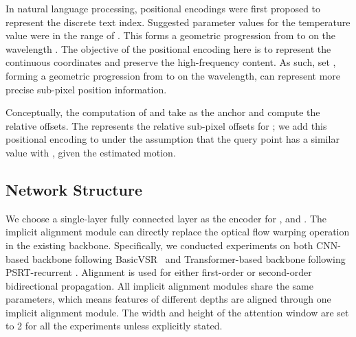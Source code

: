 \documentclass[10pt,twocolumn,letterpaper]{article}
\begin{document}
In natural language processing, positional encodings were first proposed to represent the discrete text index.  Suggested parameter values for the temperature value were in the range of .  This forms a geometric progression from  to  on the wavelength \cite{vaswani2017attention}. The objective of the positional encoding here is to represent the continuous coordinates and preserve the high-frequency content.  As such, set , forming a geometric progression from  to  on the wavelength, can represent more precise sub-pixel position information. 


Conceptually, the computation of  and  take  as the anchor and compute the relative offsets. The  represents the relative sub-pixel offsets for ; we add this positional encoding to  under the assumption that the query point  has a similar value with , given the estimated motion.




\subsection{Network Structure}
We choose a single-layer fully connected layer as the encoder for ,  and . The implicit alignment module can directly replace the optical flow warping operation in the existing backbone. Specifically, we conducted experiments on both CNN-based backbone following BasicVSR~\cite{chan2021basicvsr} and Transformer-based backbone following PSRT-recurrent \cite{shi2022rethinking}. Alignment is used for either first-order or second-order bidirectional propagation. All implicit alignment modules share the same parameters, which means features of different depths are aligned through one implicit alignment module. The width and height of the attention window are set to 2 for all the experiments unless explicitly stated.
\end{document}
